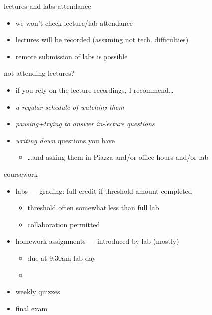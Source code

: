 \begin{frame}{lectures and labs attendance} 
    \begin{itemize}
    \item we won't check lecture/lab attendance
    \vspace{.5cm}
    \item lectures will be recorded (assuming not tech. difficulties)
    \item remote submission of labs is possible
    \end{itemize}
\end{frame}

\begin{frame}{not attending lectures?}
    \begin{itemize}
    \item if you rely on the lecture recordings, I recommend\ldots
    \vspace{.5cm}
    \item \textit{a regular schedule of watching them}
    \item \textit{pausing+trying to answer in-lecture questions}
    \item \textit{writing down} questions you have
    \begin{itemize}
        \item \ldots and asking them in Piazza and/or office hours and/or lab
    \end{itemize}
    \end{itemize}
\end{frame}

\begin{frame}{coursework}
\begin{itemize}
    \item labs --- grading: full credit if threshold amount completed
        \begin{itemize}
        \item threshold often somewhat less than full lab
        \item collaboration permitted
        \end{itemize}
    \item homework assignments --- introduced by lab (mostly)
        \begin{itemize}
        \item due at 9:30am lab day
        \item {}
        \end{itemize}
    \item weekly quizzes
    \item final exam
\end{itemize}
\end{frame}


